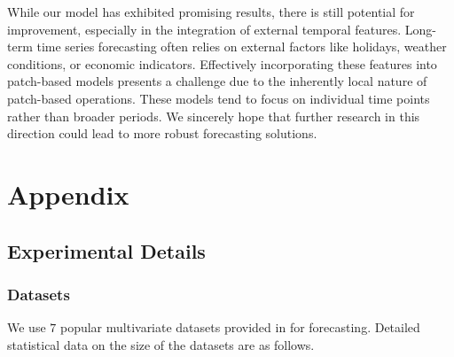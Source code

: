 \documentclass{article} \usepackage{iclr2024_conference,times}
\begin{document}
While our model has exhibited promising results, there is still potential for improvement, especially in the integration of external temporal features. Long-term time series forecasting often relies on external factors like holidays, weather conditions, or economic indicators. Effectively incorporating these features into patch-based models presents a challenge due to the inherently local nature of patch-based operations. These models tend to focus on individual time points rather than broader periods. We sincerely hope that further research in this direction could lead to more robust forecasting solutions.




\appendix
\section{Appendix}
\subsection{Experimental Details}
\label{append:exp}

\subsubsection{Datasets}
\label{sec::datasets}
We use $7$ popular multivariate datasets provided in \citep{autoformer} for forecasting. Detailed statistical data on the size of the datasets are as follows.


\begin{table}[htbp!]
\centering
{}
\caption{Statistics of popular datasets used for benchmarking.}
\label{tab::datasets}
\end{table}
\end{document}
